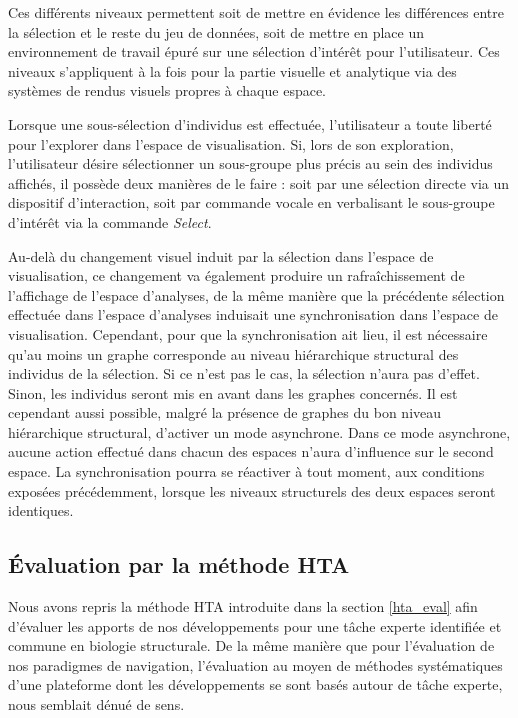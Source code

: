 Ces différents niveaux permettent soit de mettre en évidence les différences entre la sélection et le reste du jeu de données, soit de mettre en place un environnement de travail épuré sur une sélection d’intérêt pour l'utilisateur. Ces niveaux s'appliquent à la fois pour la partie visuelle et analytique via des systèmes de rendus visuels propres à chaque espace.

Lorsque une sous-sélection d'individus est effectuée, l'utilisateur a toute liberté pour l'explorer dans l'espace de visualisation. Si, lors de son exploration, l'utilisateur désire sélectionner un sous-groupe plus précis au sein des individus affichés, il possède deux manières de le faire : soit par une sélection directe via un dispositif d'interaction, soit par commande vocale en verbalisant le sous-groupe d’intérêt via la commande \textit{Select}.

Au-delà du changement visuel induit par la sélection dans l'espace de visualisation, ce changement va également produire un rafraîchissement de l'affichage de l'espace d'analyses, de la même manière que la précédente sélection effectuée dans l'espace d'analyses induisait une synchronisation dans l'espace de visualisation. Cependant, pour que la synchronisation ait lieu, il est nécessaire qu'au moins un graphe corresponde au niveau hiérarchique structural des individus de la sélection. Si ce n'est pas le cas, la sélection n'aura pas d'effet. Sinon, les individus seront mis en avant dans les graphes concernés. Il est cependant aussi possible, malgré la présence de graphes du bon niveau hiérarchique structural, d'activer un mode asynchrone. Dans ce mode asynchrone, aucune action effectué dans chacun des espaces n'aura d'influence sur le second espace. La synchronisation pourra se réactiver à tout moment, aux conditions exposées précédemment, lorsque les niveaux structurels des deux espaces seront identiques.


\subsection{Évaluation par la méthode HTA}

Nous avons repris la méthode HTA introduite dans la section \ref{hta_eval} afin d'évaluer les apports de nos développements pour une tâche experte identifiée et commune en biologie structurale. De la même manière que pour l'évaluation de nos paradigmes de navigation, l'évaluation au moyen de méthodes systématiques d'une plateforme dont les développements se sont basés autour de tâche experte, nous semblait dénué de sens.

